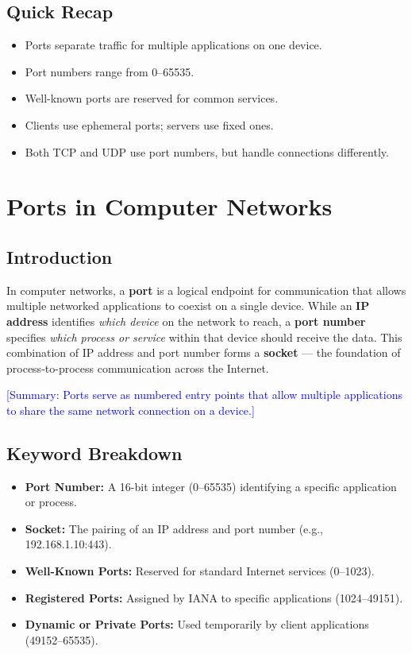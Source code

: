 \documentclass[12pt]{article}
\begin{document}
\subsection{Quick Recap}
\begin{itemize}
    \item Ports separate traffic for multiple applications on one device.
    \item Port numbers range from 0--65535.
    \item Well-known ports are reserved for common services.
    \item Clients use ephemeral ports; servers use fixed ones.
    \item Both TCP and UDP use port numbers, but handle connections differently.
\end{itemize}

\section{Ports in Computer Networks}

\subsection{Introduction}
In computer networks, a \textbf{port} is a logical endpoint for communication that allows multiple networked applications to coexist on a single device. While an \textbf{IP address} identifies \textit{which device} on the network to reach, a \textbf{port number} specifies \textit{which process or service} within that device should receive the data. This combination of IP address and port number forms a \textbf{socket} --- the foundation of process-to-process communication across the Internet.

\textcolor{blue}{[Summary: Ports serve as numbered entry points that allow multiple applications to share the same network connection on a device.]}

\subsection{Keyword Breakdown}
\begin{itemize}[label=\textbullet]
    \item \textbf{Port Number:} A 16-bit integer (0–65535) identifying a specific application or process.
    \item \textbf{Socket:} The pairing of an IP address and port number (e.g., 192.168.1.10:443).
    \item \textbf{Well-Known Ports:} Reserved for standard Internet services (0–1023).
    \item \textbf{Registered Ports:} Assigned by IANA to specific applications (1024–49151).
    \item \textbf{Dynamic or Private Ports:} Used temporarily by client applications (49152–65535).
\end{itemize}
\end{document}
